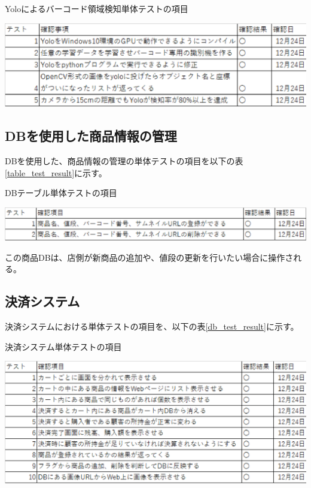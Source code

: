 \begin{table}[htbp]
\centering
\caption{Yoloによるバーコード領域検知単体テストの項目}
\includegraphics[width=14cm]{./pic/result/yolo_test_result.eps}
\label{yolo_test_result}
\end{table}

\newpage

\subsection*{DBを使用した商品情報の管理}
DBを使用した、商品情報の管理の単体テストの項目を以下の表\ref{table_test_result}に示す。

\begin{table}[htbp]
\centering
\caption{DBテーブル単体テストの項目}
\includegraphics[width=15cm]{./pic/result/table_test_result.eps}
\label{table_test_result}
\end{table}

この商品DBは、店側が新商品の追加や、値段の更新を行いたい場合に操作される。

\subsection*{決済システム}
決済システムにおける単体テストの項目を、以下の表\ref{db_test_result}に示す。

\begin{table}[htbp]
\centering
\caption{決済システム単体テストの項目}
\includegraphics[width=15cm]{./pic/result/db_test_result.eps}
\label{db_test_result}
\end{table}

